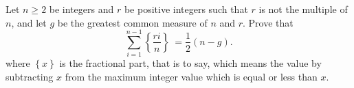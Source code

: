 Let $n\geq 2$ be integers  and $r$ be positive integers such that $r$ is not the multiple of $n$, and let $g$ be the greatest common measure of $n$ and $r$. Prove that \[ \sum_{i=1}^{n-1} \left\{\frac{ri}{n} \right\}\ =\frac{1}{2}(n-g).  \] where $\left\{x\right\}$ is the fractional part, that is to say, which means the value by subtracting $x$ from the maximum integer value which is equal or less than $x$.